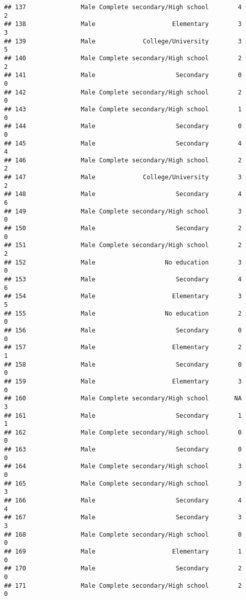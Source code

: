 \documentclass[
]{article}
\begin{document}
\begin{verbatim}
## 137               Male Complete secondary/High school        4        2
## 138               Male                     Elementary        3        3
## 139               Male             College/University        3        5
## 140               Male Complete secondary/High school        2        2
## 141               Male                      Secondary        0        0
## 142               Male Complete secondary/High school        2        0
## 143               Male Complete secondary/High school        1        0
## 144               Male                      Secondary        0        0
## 145               Male                      Secondary        4        4
## 146               Male Complete secondary/High school        2        2
## 147               Male             College/University        3        2
## 148               Male                      Secondary        4        6
## 149               Male Complete secondary/High school        3        0
## 150               Male                      Secondary        2        0
## 151               Male Complete secondary/High school        2        2
## 152               Male                   No education        3        0
## 153               Male                      Secondary        4        6
## 154               Male                     Elementary        3        5
## 155               Male                   No education        2        0
## 156               Male                      Secondary        0        0
## 157               Male                     Elementary        2        1
## 158               Male                      Secondary        0        0
## 159               Male                     Elementary        3        0
## 160               Male Complete secondary/High school       NA        3
## 161               Male                      Secondary        1        1
## 162               Male Complete secondary/High school        0        0
## 163               Male                      Secondary        0        0
## 164               Male Complete secondary/High school        3        0
## 165               Male Complete secondary/High school        3        3
## 166               Male                      Secondary        4        4
## 167               Male                      Secondary        3        3
## 168               Male Complete secondary/High school        0        0
## 169               Male                     Elementary        1        0
## 170               Male                      Secondary        2        0
## 171               Male Complete secondary/High school        2        0

\end{verbatim}
\end{document}
